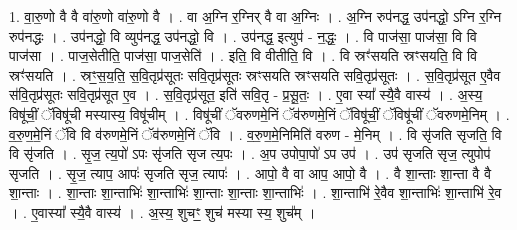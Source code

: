 \documentclass[17pt]{extarticle}
\begin{document}
1. वा॒रु॒णो वै वै वा॑रु॒णो वा॑रु॒णो वै । . वा अ॒ग्नि र॒ग्निर् वै वा अ॒ग्निः । . अ॒ग्नि रुप॑नद्ध॒ उप॑नद्धो॒ ऽग्नि र॒ग्नि रुप॑नद्धः । . उप॑नद्धो॒ वि व्युप॑नद्ध॒ उप॑नद्धो॒ वि । . उप॑नद्ध॒ इत्युप॑ - न॒द्धः॒ । . वि पाज॑सा॒ पाज॑सा॒ वि वि पाज॑सा । . पाज॒सेतीति॒ पाज॑सा॒ पाज॒सेति॑ । . इति॒ वि वीतीति॒ वि । . वि स्रꣳ॑सयति स्रꣳसयति॒ वि वि स्रꣳ॑सयति । . स्रꣳ॒॒स॒य॒ति॒ स॒वि॒तृप्र॑सूतः सवि॒तृप्र॑सूतः स्रꣳसयति स्रꣳसयति सवि॒तृप्र॑सूतः । . स॒वि॒तृप्र॑सूत ए॒वैव स॑वि॒तृप्र॑सूतः सवि॒तृप्र॑सूत ए॒व । . स॒वि॒तृप्र॑सूत॒ इति॑ सवि॒तृ - प्र॒सू॒तः॒ । . ए॒वा स्या᳚ स्यै॒वै वास्य॑ । . अ॒स्य॒ विषू॑चीं॒ ॅविषू॑ची मस्यास्य॒ विषू॑चीम् । . विषू॑चीं ॅवरुणमे॒निं ॅव॑रुणमे॒निं ॅविषू॑चीं॒ ॅविषू॑चीं ॅवरुणमे॒निम् । . व॒रु॒ण॒मे॒निं ॅवि वि व॑रुणमे॒निं ॅव॑रुणमे॒निं ॅवि । . व॒रु॒ण॒मे॒निमिति॑ वरुण - मे॒निम् । . वि सृ॑जति सृजति॒ वि वि सृ॑जति । . सृ॒ज॒ त्य॒पो॑ ऽपः सृ॑जति सृज त्य॒पः । . अ॒प उपोपा॒पो॑ ऽप उप॑ । . उप॑ सृजति सृज॒ त्युपोप॑ सृजति । . सृ॒ज॒ त्याप॒ आपः॑ सृजति सृज॒ त्यापः॑ । . आपो॒ वै वा आप॒ आपो॒ वै । . वै शा॒न्ताः शा॒न्ता वै वै शा॒न्ताः । . शा॒न्ताः शा॒न्ताभिः॑ शा॒न्ताभिः॑ शा॒न्ताः शा॒न्ताः शा॒न्ताभिः॑ । . शा॒न्ताभि॑ रे॒वैव शा॒न्ताभिः॑ शा॒न्ताभि॑ रे॒व । . ए॒वास्या᳚ स्यै॒वै वास्य॑ । . अ॒स्य॒ शुचꣳ॒॒ शुच॑ मस्या स्य॒ शुच᳚म् । \newline
\end{document}
